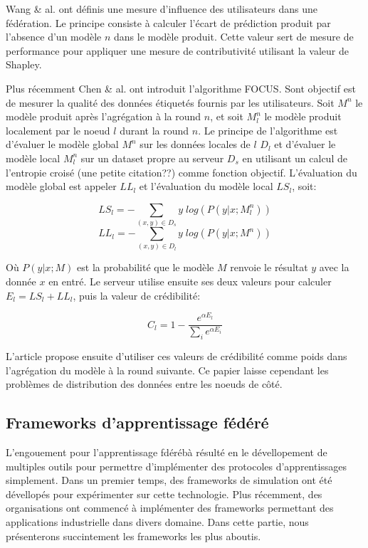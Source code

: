 \documentclass[stage3a]{tnreport} %
\begin{document}
Wang \& al. ont définis une mesure d'influence des utilisateurs dans une fédération. Le principe consiste à calculer l'écart de prédiction produit par l'absence d'un modèle $n$ dans le modèle produit. Cette valeur sert de mesure de performance pour appliquer une mesure de contributivité utilisant la valeur de Shapley.

Plus récemment Chen \& al. ont introduit l'algorithme FOCUS. Sont objectif est de mesurer la qualité des données étiquetés fournis par les utilisateurs. Soit $M^n$ le modèle produit après l'agrégation à la round $n$, et soit $M_l^n$ le modèle produit localement par le noeud $l$ durant la round $n$. Le principe de l'algorithme est d'évaluer le modèle global $M^n$ sur les données locales de $l$ $D_l$ et d'évaluer le modèle local $M_l^n$ sur un dataset propre au serveur $D_s$ en utilisant un calcul de l'entropie croisé (une petite citation??) comme fonction objectif. L'évaluation du modèle global est appeler $LL_l$ et l'évaluation du modèle local $LS_l$, soit:


\begin{equation}
    LS_l = -\sum_{(x,y)\in D_s} y \; log(P(y|x;M_l^n)) 
\end{equation}
\begin{equation}
    LL_l = -\sum_{(x,y)\in D_l} y \; log(P(y|x;M^n))
\end{equation} 

Où $P(y|x;M)$ est la probabilité que le modèle $M$ renvoie le résultat $y$ avec la donnée $x$ en entré. Le serveur utilise ensuite ses deux valeurs pour calculer $E_l = LS_l + LL_l$, puis la valeur de crédibilité:

\begin{equation}
    C_l=1 - \frac{e^{\alpha E_l}}{\sum_i e^{\alpha E_i}}    
\end{equation}

L'article propose ensuite d'utiliser ces valeurs de crédibilité comme poids dans l'agrégation du modèle à la round suivante. Ce papier laisse cependant les problèmes de distribution des données entre les noeuds de côté.


\subsection{Frameworks d'apprentissage fédéré}

L'engouement pour l'apprentissage fdérébà résulté en le dévellopement de multiples outils pour permettre d'implémenter des protocoles d'apprentissages simplement. Dans un premier temps, des frameworks de simulation ont été dévellopés pour expérimenter sur cette technologie. Plus récemment, des organisations ont commencé à implémenter des frameworks permettant des applications industrielle dans divers domaine. Dans cette partie, nous présenterons succintement les frameworks les plus aboutis.
\end{document}
